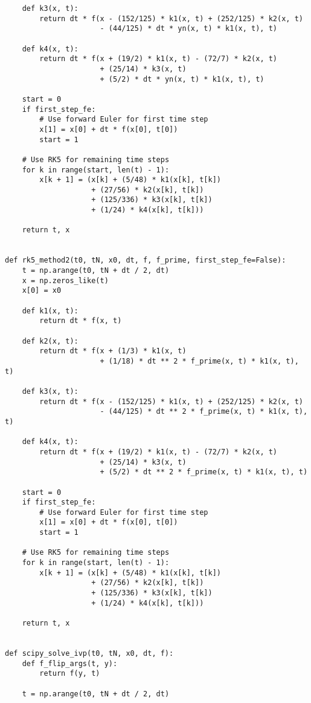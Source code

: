 \documentclass{article}
\begin{document}
\begin{verbatim}
    def k3(x, t):
        return dt * f(x - (152/125) * k1(x, t) + (252/125) * k2(x, t)
                      - (44/125) * dt * yn(x, t) * k1(x, t), t)

    def k4(x, t):
        return dt * f(x + (19/2) * k1(x, t) - (72/7) * k2(x, t)
                      + (25/14) * k3(x, t)
                      + (5/2) * dt * yn(x, t) * k1(x, t), t)

    start = 0
    if first_step_fe:
        # Use forward Euler for first time step
        x[1] = x[0] + dt * f(x[0], t[0])
        start = 1

    # Use RK5 for remaining time steps
    for k in range(start, len(t) - 1):
        x[k + 1] = (x[k] + (5/48) * k1(x[k], t[k])
                    + (27/56) * k2(x[k], t[k])
                    + (125/336) * k3(x[k], t[k])
                    + (1/24) * k4(x[k], t[k]))

    return t, x


def rk5_method2(t0, tN, x0, dt, f, f_prime, first_step_fe=False):
    t = np.arange(t0, tN + dt / 2, dt)
    x = np.zeros_like(t)
    x[0] = x0

    def k1(x, t):
        return dt * f(x, t)

    def k2(x, t):
        return dt * f(x + (1/3) * k1(x, t)
                      + (1/18) * dt ** 2 * f_prime(x, t) * k1(x, t), t)

    def k3(x, t):
        return dt * f(x - (152/125) * k1(x, t) + (252/125) * k2(x, t)
                      - (44/125) * dt ** 2 * f_prime(x, t) * k1(x, t), t)

    def k4(x, t):
        return dt * f(x + (19/2) * k1(x, t) - (72/7) * k2(x, t)
                      + (25/14) * k3(x, t)
                      + (5/2) * dt ** 2 * f_prime(x, t) * k1(x, t), t)

    start = 0
    if first_step_fe:
        # Use forward Euler for first time step
        x[1] = x[0] + dt * f(x[0], t[0])
        start = 1

    # Use RK5 for remaining time steps
    for k in range(start, len(t) - 1):
        x[k + 1] = (x[k] + (5/48) * k1(x[k], t[k])
                    + (27/56) * k2(x[k], t[k])
                    + (125/336) * k3(x[k], t[k])
                    + (1/24) * k4(x[k], t[k]))

    return t, x


def scipy_solve_ivp(t0, tN, x0, dt, f):
    def f_flip_args(t, y):
        return f(y, t)

    t = np.arange(t0, tN + dt / 2, dt)


\end{verbatim}
\end{document}
